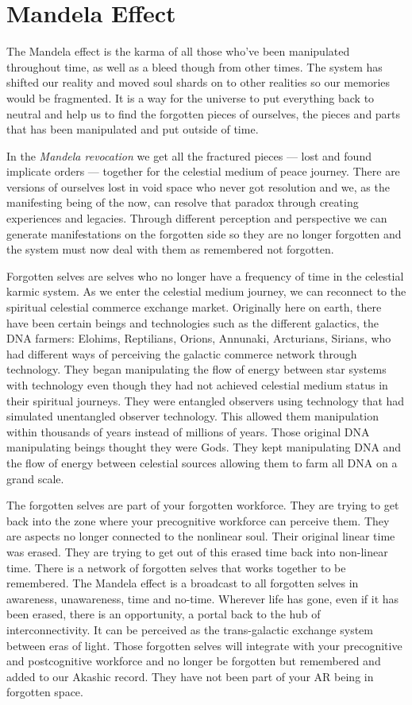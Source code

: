 \documentclass[letterpaper,9pt,twoside,titlepage,onecolumn,openany]{book}
\begin{document}
\section*{Mandela Effect}\label{mandela-effect}

The Mandela effect is the karma of all those who've been manipulated
throughout time, as well as a bleed though from other times. The system
has shifted our reality and moved soul shards on to other realities so
our memories would be fragmented. It is a way for the universe to put
everything back to neutral and help us to find the forgotten pieces of
ourselves, the pieces and parts that has been manipulated and put
outside of time.

In the \emph{Mandela revocation} we get all the fractured pieces ---
lost and found implicate orders --- together for the celestial medium of
peace journey. There are versions of ourselves lost in void space who
never got resolution and we, as the manifesting being of the now, can
resolve that paradox through creating experiences and legacies. Through
different perception and perspective we can generate manifestations on
the forgotten side so they are no longer forgotten and the system must
now deal with them as remembered not forgotten.

Forgotten selves are selves who no longer have a frequency of time in
the celestial karmic system. As we enter the celestial medium journey,
we can reconnect to the spiritual celestial commerce exchange market.
Originally here on earth, there have been certain beings and
technologies such as the different galactics, the DNA farmers: Elohims,
Reptilians, Orions, Annunaki, Arcturians, Sirians, who had different
ways of perceiving the galactic commerce network through technology.
They began manipulating the flow of energy between star systems with
technology even though they had not achieved celestial medium status in
their spiritual journeys. They were entangled observers using technology
that had simulated unentangled observer technology. This allowed them
manipulation within thousands of years instead of millions of years.
Those original DNA manipulating beings thought they were Gods. They kept
manipulating DNA and the flow of energy between celestial sources
allowing them to farm all DNA on a grand scale.

The forgotten selves are part of your forgotten workforce. They are
trying to get back into the zone where your precognitive workforce can
perceive them. They are aspects no longer connected to the nonlinear
soul. Their original linear time was erased. They are trying to get out
of this erased time back into non-linear time. There is a network of
forgotten selves that works together to be remembered. The Mandela
effect is a broadcast to all forgotten selves in awareness, unawareness,
time and no-time. Wherever life has gone, even if it has been erased,
there is an opportunity, a portal back to the hub of interconnectivity.
It can be perceived as the trans-galactic exchange system between eras
of light. Those forgotten selves will integrate with your precognitive
and postcognitive workforce and no longer be forgotten but remembered
and added to our Akashic record. They have not been part of your AR
being in forgotten space.
\end{document}
